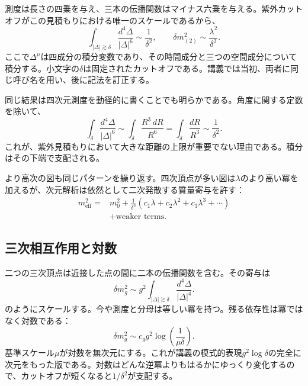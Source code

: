 測度は長さの四乗を与え、三本の伝播関数はマイナス六乗を与える。紫外カットオフがこの見積もりにおける唯一のスケールであるから、
\begin{equation}
\int_{|\Delta|\gtrsim\delta}
\frac{d^4\Delta}{|\Delta|^6}
\sim\frac{1}{\delta^2},
\qquad
\delta m^2_{(2)}
\sim\frac{\lambda^2}{\delta^2}.
\label{eq:two-loop-scalar-mass}
\end{equation}
ここで\(\Delta^\mu\)は四成分の積分変数であり、その時間成分と三つの空間成分について積分する。小文字の\(\delta\)は固定されたカットオフである。講義では当初、両者に同じ呼び名を用い、後に記法を訂正する。

同じ結果は四次元測度を動径的に書くことでも明らかである。角度に関する定数を除いて、
\begin{equation}
\int_{\delta}\frac{d^4\Delta}{|\Delta|^6}
\sim
\int_{\delta}\frac{R^3\,dR}{R^6}
=\int_{\delta}\frac{dR}{R^3}
\sim\frac{1}{\delta^2}.
\end{equation}
これが、紫外見積もりにおいて大きな距離の上限が重要でない理由である。積分はその下端で支配される。

より高次の図も同じパターンを繰り返す。四次頂点が多い図は\(\lambda\)のより高い冪を加えるが、次元解析は依然として二次発散する質量寄与を許す：
\begin{equation}
\begin{aligned}
m_{\mathrm{eff}}^2
={}&m_0^2
+\frac{1}{\delta^2}
\left(c_1\lambda+c_2\lambda^2+c_3\lambda^3+\cdots\right)\\
&+\text{weaker terms}.
\end{aligned}
\label{eq:scalar-mass-series}
\end{equation}

\subsection{三次相互作用と対数}

二つの三次頂点は近接した点の間に二本の伝播関数を含む。その寄与は
\begin{equation}
\delta m_g^2
\sim
g^2\int_{|\Delta|\gtrsim\delta}
\frac{d^4\Delta}{|\Delta|^4}.
\label{eq:cubic-loop}
\end{equation}
のようにスケールする。今や測度と分母は等しい冪を持つ。残る依存性は冪ではなく対数である：
\begin{equation}
\delta m_g^2
\sim
c_g g^2\log\!\left(\frac{1}{\mu\delta}\right).
\label{eq:cubic-log}
\end{equation}
基準スケール\(\mu\)が対数を無次元にする。これが講義の模式的表現\(g^2\log\delta\)の完全に次元をもった版である。対数はどんな逆冪よりもはるかにゆっくり変化するので、カットオフが短くなると\(1/\delta^2\)が支配する。

